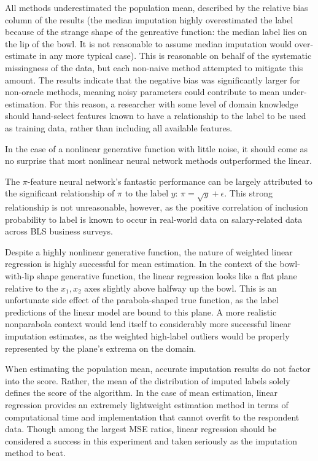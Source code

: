 \documentclass[12pt,twoside]{reedthesis}
\begin{document}
All methods underestimated the population mean, described by the
relative bias column of the results (the median imputation highly
overestimated the label because of the strange shape of the genreative
function: the median label lies on the lip of the bowl. It is not
reasonable to assume median imputation would over-estimate in any more
typical case). This is reasonable on behalf of the systematic
missingness of the data, but each non-naive method attempted to mitigate
this amount. The results indicate that the negative bias was
significantly larger for non-oracle methods, meaning noisy parameters
could contribute to mean under-estimation. For this reason, a researcher
with some level of domain knowledge should hand-select features known to
have a relationship to the label to be used as training data, rather
than including all available features.

In the case of a nonlinear generative function with little noise, it
should come as no surprise that most nonlinear neural network methods
outperformed the linear.

The \(\pi\)-feature neural network's fantastic performance can be
largely attributed to the significant relationship of \(\pi\) to the
label \(y\): \(\pi = \sqrt{y} + \epsilon\). This strong relationship is
not unreasonable, however, as the positive correlation of inclusion
probability to label is known to occur in real-world data on
salary-related data across BLS business surveys.

Despite a highly nonlinear generative function, the nature of weighted
linear regression is highly successful for mean estimation. In the
context of the bowl-with-lip shape generative function, the linear
regression looks like a flat plane relative to the \(x_1, x_2\) axes
slightly above halfway up the bowl. This is an unfortunate side effect
of the parabola-shaped true function, as the label predictions of the
linear model are bound to this plane. A more realistic nonparabola
context would lend itself to considerably more successful linear
imputation estimates, as the weighted high-label outliers would be
properly represented by the plane's extrema on the domain.

When estimating the population mean, accurate imputation results do not
factor into the score. Rather, the mean of the distribution of imputed
labels solely defines the score of the algorithm. In the case of mean
estimation, linear regression provides an extremely lightweight
estimation method in terms of computational time and implementation that
cannot overfit to the respondent data. Though among the largest MSE
ratios, linear regression should be considered a success in this
experiment and taken seriously as the imputation method to beat.
\end{document}
